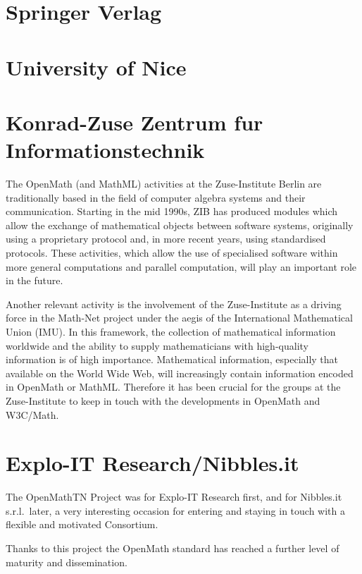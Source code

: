 \section{Springer Verlag}
 
\section{University of Nice}

\section{Konrad-Zuse Zentrum fur Informationstechnik}

The OpenMath (and MathML) activities at the Zuse-Institute Berlin are
traditionally based in the field of computer algebra systems and their
communication. Starting in the mid 1990s, ZIB has produced modules which
allow the exchange of mathematical objects between software systems,
originally using a proprietary protocol and, in more recent years, using
standardised protocols. These activities, which allow the use of
specialised software within more general computations and parallel
computation, will play an important role in the future.

Another relevant activity is the involvement of the Zuse-Institute as a
driving force in the Math-Net project under the aegis of the
International Mathematical Union (IMU). In this framework, the
collection of mathematical information worldwide and the ability to
supply mathematicians with high-quality information is of high
importance.  Mathematical information, especially that available on the
World Wide Web, will increasingly contain information encoded in
OpenMath or MathML.  Therefore it has been crucial for the groups at the
Zuse-Institute to keep in touch with the developments in OpenMath and
W3C/Math.


\section{Explo-IT Research/Nibbles.it}

The OpenMathTN Project was for Explo-IT Research first, and for
Nibbles.it s.r.l.~later, a very interesting occasion for entering and
staying in touch with a flexible and motivated Consortium.
                                                                                
Thanks to this project the OpenMath standard has reached a further level
of maturity and dissemination.
                                                                                
